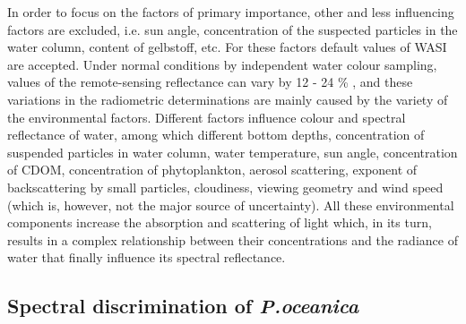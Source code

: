 \documentclass[11pt]{article}
\begin{document}
In order to focus on the factors of primary importance, other and less influencing factors are excluded,
i.e. sun angle, concentration of the suspected particles in the water column, content of gelbstoff, etc.
For these factors default values of \ac{WASI} are accepted.
Under normal conditions by independent water colour sampling, values of the remote-sensing
reflectance can vary by 12 - 24 \% \cite{Toole00}\label{Toole00}, and these variations in the radiometric
determinations are mainly caused by the variety of the environmental factors.
Different factors influence colour and spectral reflectance of water, among which different bottom
depths, concentration of suspended particles in water column, water temperature, sun angle,
concentration of \ac{CDOM}, concentration of phytoplankton,
aerosol scattering, exponent of backscattering by small particles, cloudiness, viewing geometry and
wind speed (which is, however, not the major source of uncertainty). All these environmental
components increase the absorption and scattering of light which, in its turn, results in a complex
relationship between their concentrations and the radiance of water that finally influence its spectral
reflectance.

\subsection{Spectral discrimination of \textit{P.oceanica}}
\end{document}
